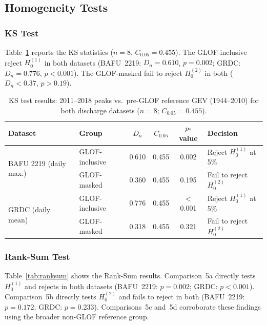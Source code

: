 \subsection{Homogeneity Tests}
\label{sec:results:tests}

\subsubsection{KS Test}

Table~\ref{tab:ks} reports the KS statistics ($n = 8$, $C_{0.05} = 0.455$). The GLOF-inclusive
reject $H_0^{(1)}$ in both datasets (BAFU~2219: $D_n = 0.610$, $p = 0.002$;
GRDC: $D_n = 0.776$, $p < 0.001$). The GLOF-masked fail to reject $H_0^{(2)}$ in both
($D_n < 0.37$, $p > 0.19$).

\begin{table}[H]
  \centering
  \caption{KS test results: 2011--2018 peaks vs.\ pre-GLOF reference GEV (1944--2010)
           for both discharge datasets ($n = 8$; $C_{0.05} = 0.455$).}
  \label{tab:ks}
  \begin{tabular}{llcccl}
    \toprule
    Dataset & Group & $D_n$ & $C_{0.05}$ & $p$-value & Decision \\
    \midrule
    \multirow{2}{*}{BAFU 2219 (daily max.)}
      & GLOF-inclusive & 0.610 & 0.455 & 0.002    & Reject $H_0^{(1)}$ at 5\% \\
      & GLOF-masked    & 0.360 & 0.455 & 0.195    & Fail to reject $H_0^{(2)}$ \\
    \midrule
    \multirow{2}{*}{GRDC (daily mean)}
      & GLOF-inclusive & 0.776 & 0.455 & $<$0.001 & Reject $H_0^{(1)}$ at 5\% \\
      & GLOF-masked    & 0.318 & 0.455 & 0.321    & Fail to reject $H_0^{(2)}$ \\
    \bottomrule
  \end{tabular}
\end{table}

\subsubsection{Rank-Sum Test}

Table~\ref{tab:ranksum} shows the Rank-Sum results. Comparison~5a directly tests
$H_0^{(1)}$ and rejects in both datasets (BAFU~2219: $p = 0.002$; GRDC: $p < 0.001$).
Comparison~5b directly tests $H_0^{(2)}$ and fails to reject in both (BAFU~2219:
$p = 0.172$; GRDC: $p = 0.233$). Comparisons~5c and~5d corroborate these findings
using the broader non-GLOF reference group.

